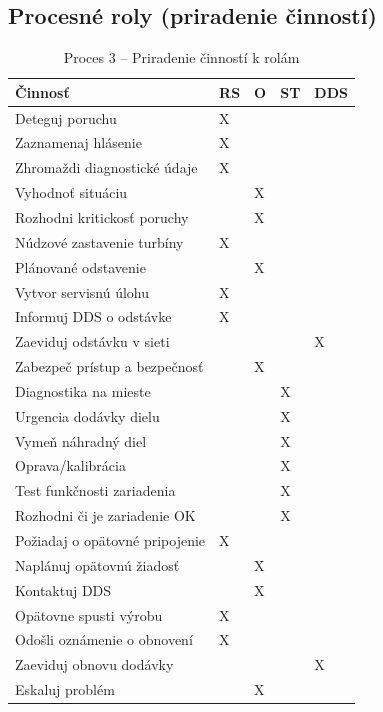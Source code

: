 \documentclass[12pt,a4paper]{article}
\begin{document}
\subsection{Procesné roly (priradenie činností)}
\begin{table}[H]
  \centering
  \small
  \renewcommand{\arraystretch}{1.2}
  \begin{tabularx}{\textwidth}{|X|p{}|p{}|p{}|p{}|}
    \hline
    \textbf{Činnosť} & \textbf{RS} & \textbf{O} & \textbf{ST} & \textbf{DDS} \\
    \hline
    Deteguj poruchu & X &  &  &  \\
    \hline
    Zaznamenaj hlásenie & X &  &  &  \\
    \hline
    Zhromaždi diagnostické údaje & X &  &  &  \\
    \hline
    Vyhodnoť situáciu &  & X &  &  \\
    \hline
    Rozhodni kritickosť poruchy &  & X &  &  \\
    \hline
    Núdzové zastavenie turbíny & X &  &  &  \\
    \hline
    Plánované odstavenie &  & X &  &  \\
    \hline
    Vytvor servisnú úlohu & X &  &  &  \\
    \hline
    Informuj DDS o odstávke & X &  &  &  \\
    \hline
    Zaeviduj odstávku v sieti &  &  &  & X \\
    \hline
    Zabezpeč prístup a bezpečnosť &  & X &  &  \\
    \hline
    Diagnostika na mieste &  &  & X &  \\
    \hline
    Urgencia dodávky dielu &  &  & X &  \\
    \hline
    Vymeň náhradný diel &  &  & X &  \\
    \hline
    Oprava/kalibrácia &  &  & X &  \\
    \hline
    Test funkčnosti zariadenia &  &  & X &  \\
    \hline
    Rozhodni či je zariadenie OK &  &  & X &  \\
    \hline
    Požiadaj o opätovné pripojenie & X &  &  &  \\
    \hline
    Naplánuj opätovnú žiadosť &  & X &  &  \\
    \hline
    Kontaktuj DDS &  & X &  &  \\
    \hline
    Opätovne spusti výrobu & X &  &  &  \\
    \hline
    Odošli oznámenie o obnovení & X &  &  &  \\
    \hline
    Zaeviduj obnovu dodávky &  &  &  & X \\
    \hline
    Eskaluj problém &  & X &  &  \\
    \hline
  \end{tabularx}
  \caption{Proces 3 -- Priradenie činností k rolám}
\end{table}
\end{document}
